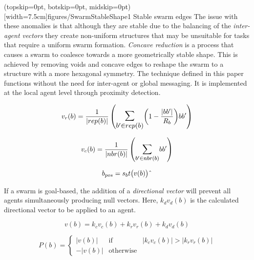 \documentclass{ieeeaccess}
\begin{document}
\Figure[t!](topskip=0pt, botskip=0pt, midskip=0pt)[width=7.5cm]{figures/SwarmStableShape1}
{Stable swarm edges\label{concave:SwarmStableShape1}}
The issue with these anomalies is that although they are stable due to the balancing of the \textit{inter-agent vectors} they create non-uniform structures that may be unsuitable for tasks that require a uniform swarm formation.
\textit{Concave reduction} is a process that causes a swarm to coalesce towards a more geometrically stable shape. This is achieved by removing voids and concave edges to reshape the swarm to a structure with a more hexagonal symmetry.  
The technique defined in this paper functions without the need for inter-agent or global messaging. It is implemented at the local agent level through proximity detection.

\begin{equation}\label{eq:Repulsion1}
v_{r}(b) = 
\frac{1}{|rep(b)|}
\left(
\mathlarger{\mathlarger{\sum_{b' \in rep(b)}}}
{\left( 1-\frac{|bb'|}{R_b} \right)}
{bb'}
\right)
\end{equation}

\begin{equation}\label{eq:FlyToCentre1}
v_{c}(b) = \frac{1}{|nbr(b)|}\left({\mathlarger{\sum_{b' \in nbr(b)}}{bb'}}\right)
\end{equation}

\begin{equation}\label{eq:AgentMovement}
b_{pos}=s_{b}t\big(v(b)\big)\string^ 
\end{equation}

If a swarm is goal-based, the addition of a \emph{directional vector} will prevent all agents simultaneously producing null vectors. Here, $k_dv_{d}(b)$ is the calculated directional vector to be applied to an agent.

\begin{equation}\label{eq:InterAgentMovementDirectional1}
v(b) = k_cv_{c}(b) + k_rv_{r}(b) + k_dv_{d}(b)
\end{equation}

\begin{equation}
\label{eq:CohesionRepulsion}
P(b) = \left\{\begin{array}{lll}
   |v(b)|& \mathrm{if} & |k_cv_c(b)| > |k_r v_r(b)|\\
  -|v(b)|& \mathrm{otherwise}
  \end{array}\right.
\end{equation}
\end{document}
